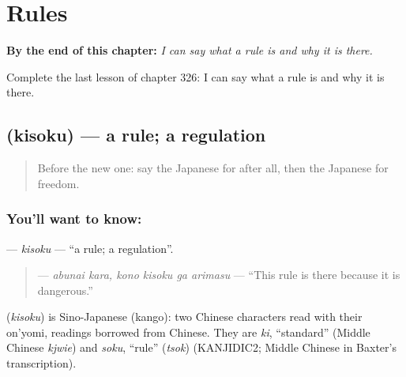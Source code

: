 
\chapter{Rules}
\label{ch:ja-rules}

\begin{chapteropening}
\textbf{By the end of this chapter:} \emph{I can say what a rule is and why it is there.}

Complete the last lesson of chapter 326: I can say what a rule is and why it is there.
\end{chapteropening}

\section[\texorpdfstring{\ja{きそく} (kisoku)}{きそく (kisoku)}]{ (kisoku) — a rule; a regulation}

\label{lesson:JA-C326-kisoku}



\begin{quote}
Before the new one: say the Japanese for after all, then the Japanese for freedom.
\end{quote}

\subsection*{You'll want to know: }
\textbf{} — \emph{kisoku} — \textquotedblleft{}a rule; a regulation\textquotedblright{}.

\begin{quote}
\textbf{  } — \emph{abunai kara, kono kisoku ga arimasu} — \textquotedblleft{}This rule is there because it is dangerous.\textquotedblright{}
\end{quote}

\begin{cousinweb}
\textbf{} (\emph{kisoku}) is Sino-Japanese (kango): two Chinese characters read with their on'yomi, readings borrowed from Chinese. They are \emph{ki}, \textquotedblleft{}standard\textquotedblright{} (Middle Chinese \emph{kjwie}) and \emph{soku}, \textquotedblleft{}rule\textquotedblright{} (\emph{tsok}) (KANJIDIC2; Middle Chinese in Baxter's transcription).
\end{cousinweb}

